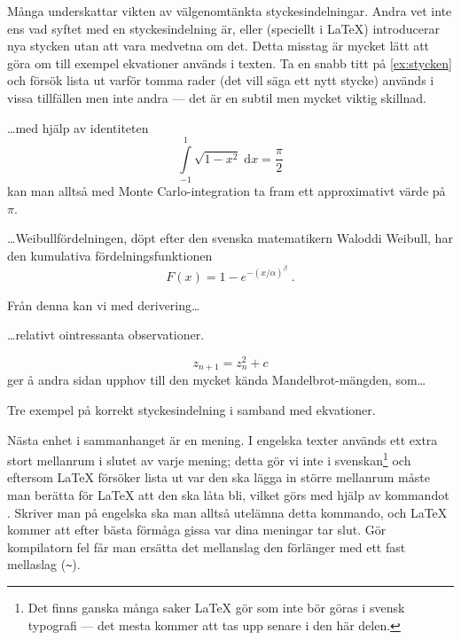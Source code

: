 \documentclass[10pt,../../a4.tex]{subfiles}
\begin{document}
Många underskattar vikten av välgenomtänkta styckesindelningar. Andra vet
inte ens vad syftet med en styckesindelning är, eller (speciellt i 
\LaTeX{}) introducerar nya stycken utan att vara medvetna om det. Detta
misstag är mycket lätt att göra om till exempel ekvationer används i 
texten. Ta
en snabb titt på \cref{ex:stycken} och försök lista ut varför
tomma rader (det vill säga ett nytt stycke) används i vissa tillfällen 
men inte andra — det är en subtil men mycket viktig skillnad.

\begin{kod}[p]
	\begin{latexcode}
\ldots{}med hjälp av identiteten
\begin{equation}
\int\limits_{-1}^1\!\sqrt{1-x^2}\;\mathrm{d}x
= \frac{\pi}{2}
\end{equation}
kan man alltså med Monte Carlo-integration ta fram
ett approximativt värde på \(\pi\).

\ldots{}Weibullfördelningen, döpt efter den svenska
matematikern Waloddi Weibull, har den kumulativa
fördelningsfunktionen
\begin{equation}
F(x) = 1 - e^{-(x/\alpha)^\beta} \;.
\end{equation}

Från denna kan vi med derivering\ldots{}

\ldots{}relativt ointressanta observationer.

\begin{equation}
z_{n+1} = z_n^2 + c
\end{equation}
ger å andra sidan upphov till den mycket kända
Mandelbrot-mängden, som\ldots{}

	\end{latexcode}
	\caption{Tre exempel på korrekt styckesindelning i samband med
	ekvationer.}
	\label{ex:stycken}
\end{kod}

Nästa enhet i sammanhanget är en mening. I engelska texter används ett
extra stort mellanrum i slutet av varje mening; detta gör vi inte i
svenskan\footnote{Det finns ganska många saker \LaTeX{} gör som inte bör
göras i svensk typografi — det mesta kommer att tas upp senare i den här 
delen.} och eftersom \LaTeX{} försöker lista ut var den ska lägga in
större mellanrum måste man berätta för \LaTeX{} att den ska låta bli,
vilket görs
med hjälp av kommandot . Skriver man på engelska ska
man alltså utelämna detta kommando, och \LaTeX{} kommer att efter bästa
förmåga gissa var dina meningar tar slut. Gör kompilatorn fel får man 
ersätta det mellanslag den förlänger med ett fast mellaslag (\verb|~|).
\end{document}
